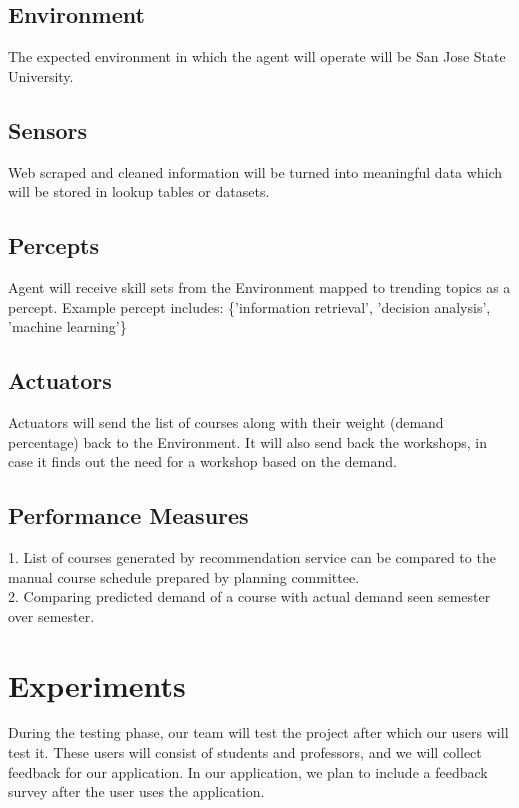 \documentclass{article}
\begin{document}
\subsection{Environment}
The expected environment in which the agent will operate will be San Jose State University. 

\subsection{Sensors}
Web scraped and cleaned information will be turned into meaningful data which will be stored in lookup tables or datasets.


\subsection{Percepts}
Agent will receive skill sets from the Environment mapped to trending topics as a percept. Example percept includes: 
\{'information retrieval', 'decision analysis', 'machine learning'\}

\subsection{Actuators}
Actuators will send the list of courses along with their weight (demand percentage) back to the Environment. It will also send back the workshops, in case it finds out the need for a workshop based on the demand.

\subsection{Performance Measures}
1. List of courses generated by recommendation service can be compared to the manual course schedule prepared by planning committee.\\
2. Comparing predicted demand of a course with actual demand seen semester over semester.\\

\section{Experiments}
During the testing phase, our team will test the project after which our users will test it. These users will consist of students and professors, and we will collect feedback for our application. In our application, we plan to include a feedback survey after the user uses the application. 

 

\end{document}

